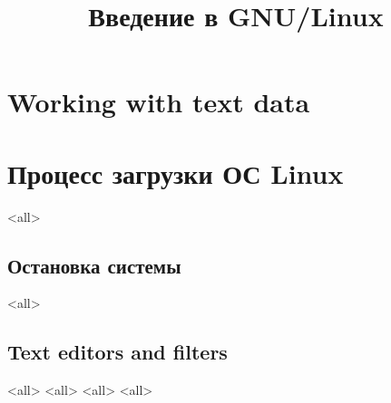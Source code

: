 

\title{Введение в GNU/Linux}








\begin{frame}
	\frametitle{}
	\titlepage
	\vspace{-0.5cm}
	\begin{center}
	\end{center}
\end{frame}





\section{Working with text data}
\section{Процесс загрузки ОС Linux}
\mode<all>{}
\subsection{Остановка системы}
\mode<all>{}

\subsection{Text editors and filters}
\mode<all>{}
\mode<all>{} 
\mode<all>{} 
\mode<all>{}




